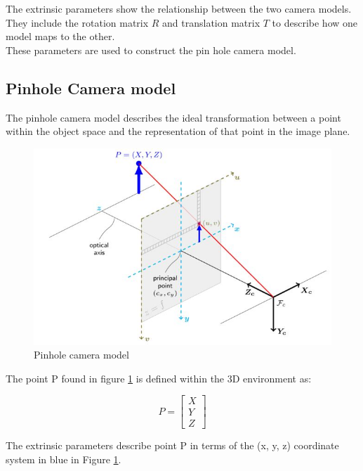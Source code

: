 The extrinsic parameters show the relationship between the two camera models. They include the rotation matrix $R$ and translation matrix $T$ to describe how one model maps to the other.\\

These parameters are used to construct the pin hole camera model.

\subsection{Pinhole Camera model}
\label{sec:pinhole}

The pinhole camera model describes the ideal transformation between a point within the object space and the representation of that point in the image plane. 


\begin{figure}[H]
\centering
\includegraphics[scale=0.75]{images/pinhole_model.JPG}
\caption{Pinhole camera model \cite{calib3d}}
\label{fig:pinhole_model}	
\end{figure}

The point P found in figure \ref{fig:pinhole_model} is defined within the 3D environment as:

\begin{equation}\label{eq:principleP}
P =  \begin{bmatrix}{X}\\{Y}\\{Z}\end{bmatrix}
\end{equation}

The extrinsic parameters describe point P in terms of the (x, y, z) coordinate system in blue in Figure \ref{fig:pinhole_model}.

